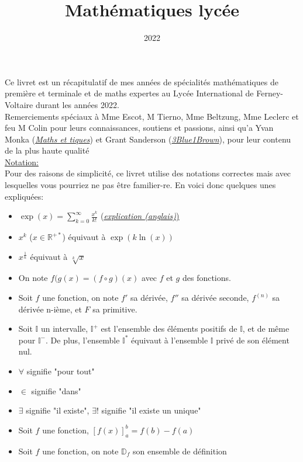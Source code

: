 \documentclass{article}
\title{Mathématiques lycée}
\date{2022\textemdash 2024}
\begin{document}
\maketitle
Ce livret est un récapitulatif de mes années de spécialités mathématiques de première et terminale et de maths expertes au Lycée International de Ferney-Voltaire durant les années 2022.\\
Remerciements spéciaux à Mme Escot, M Tierno, Mme Beltzung, Mme Leclerc et feu M Colin  pour leurs connaissances, soutiens et passions, ainsi qu'a Yvan Monka (\href{https://www.maths-et-tiques.fr/}{\textit{Maths et tiques}}) et Grant Sanderson (\href{https://www.3blue1brown.com}{\textit{3Blue1Brown}}), pour leur contenu de la plus haute qualité\\
\break
\underline{Notation:}\\
Pour des raisons de simplicité, ce livret utilise des notations correctes mais avec lesquelles vous pourriez ne pas être familier-re. En voici donc quelques unes expliquées:
\begin{itemize}
	\item $\exp(x) = \sum_{k=0}^{\infty} \frac{x^k}{k!}$ (\href{https://youtu.be/3d6DsjIBzJ4}{\underline{\textit{explication (anglais)})}}
	\item $x^k$ ($x\in\mathbb{R^{+*}}$) équivaut à $\exp(k\ln(x))$
	\item $x^\frac{1}{n}$ équivaut à $\sqrt[k]{x}$
	\item On note $f(g(x) = (f\circ g)(x)$ avec $f$ et $g$ des fonctions.
	\item Soit $f$ une fonction, on note $f'$ sa dérivée, $f''$ sa dérivée seconde, $f^{(n)}$ sa dérivée n-ième, et $F$ sa primitive.
	\item Soit $\mathbb{I}$ un intervalle, $\mathbb{I^+}$ est l'ensemble des éléments positifs de $\mathbb{I}$, et de même pour $\mathbb{I^-}$. De plus, l'ensemble $\mathbb{I^*}$ équivaut à l'ensemble $\mathbb{I}$ privé de son élément nul.
	\item $\forall$ signifie "pour tout"
	\item $\in$ signifie "dans"
	\item $\exists$ signifie "il existe", $\exists!$ signifie "il existe un unique"
	\item Soit $f$ une fonction, $[f(x)]_a^b = f(b)-f(a)$
	\item Soit $f$ une fonction, on note $\mathbb{D}_f$ son ensemble de définition 
\end{itemize}
\end{document}
